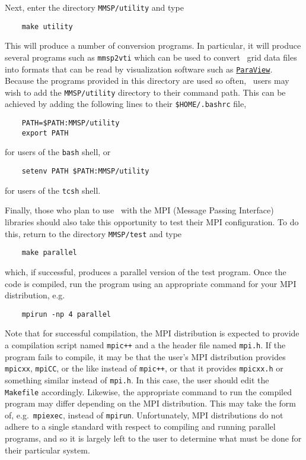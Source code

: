 Next, enter the directory {\tt MMSP/utility} and type
\begin{shadebox}
\begin{verbatim}
    make utility
\end{verbatim}
\end{shadebox}
This will produce a number of conversion programs.  In particular, it will produce several programs such as {\tt mmsp2vti} which can be used to convert \MMSP\ grid data files into formats that can be read by visualization software such as \href{http://www.paraview.org}{\tt ParaView}.  Because the programs provided in this directory are used so often, \MMSP\ users may wish to add the {\tt MMSP/utility} directory to their command path.  This can be achieved by adding the following lines to their {\tt \$HOME/.bashrc} file,
\begin{shadebox}
\begin{verbatim}
    PATH=$PATH:MMSP/utility
    export PATH
\end{verbatim}
\end{shadebox}
for users of the {\tt bash} shell, or
\begin{shadebox}
\begin{verbatim}
    setenv PATH $PATH:MMSP/utility
\end{verbatim}
\end{shadebox}
for users of the {\tt tcsh} shell.

Finally, those who plan to use \MMSP\ with the MPI (Message Passing Interface) libraries should also take this opportunity to test their MPI configuration.  To do this, return to the directory {\tt MMSP/test} and type
\begin{shadebox}
\begin{verbatim}
    make parallel
\end{verbatim}
\end{shadebox}
which, if successful, produces a parallel version of the test program.  Once the code is compiled, run the program using an appropriate command for your MPI distribution, e.g.\
\begin{shadebox}
\begin{verbatim}
    mpirun -np 4 parallel
\end{verbatim}
\end{shadebox}
Note that for successful compilation, the MPI distribution is expected to provide a compilation script named {\tt mpic++} and a the header file named {\tt mpi.h}.  If the program fails to compile, it may be that the user's MPI distribution provides {\tt mpicxx}, {\tt mpiCC}, or the like instead of {\tt mpic++}, or that it provides {\tt mpicxx.h} or something similar instead of {\tt mpi.h}.  In this case, the user should edit the {\tt Makefile} accordingly.  Likewise, the appropriate command to run the compiled program may differ depending on the MPI distribution.  This may take the form of, e.g.\ {\tt mpiexec}, instead of {\tt mpirun}.  Unfortunately, MPI distributions do not adhere to a single standard with respect to compiling and running parallel programs, and so it is largely left to the user to determine what must be done for their particular system.

